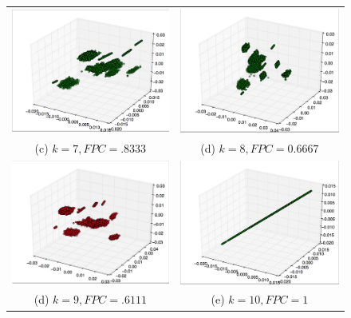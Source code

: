 \documentclass[letterpaper, 12pt]{article}
\begin{document}
\begin{figure}[H]
\centering
\begin{tabular}{cc}
 \includegraphics[width=65mm]{k7} &   \includegraphics[width=65mm]{k8} \\
(c) $k = 7, FPC = .8333$ & (d) $k = 8, FPC =  0.6667$ \\[6pt]
 \includegraphics[width=65mm]{k9} &   \includegraphics[width=65mm]{k10} \\
(d) $k = 9, FPC = .6111$ & (e) $k = 10, FPC = 1$ \\[6pt]
\end{tabular}
\end{figure}
\end{document}
